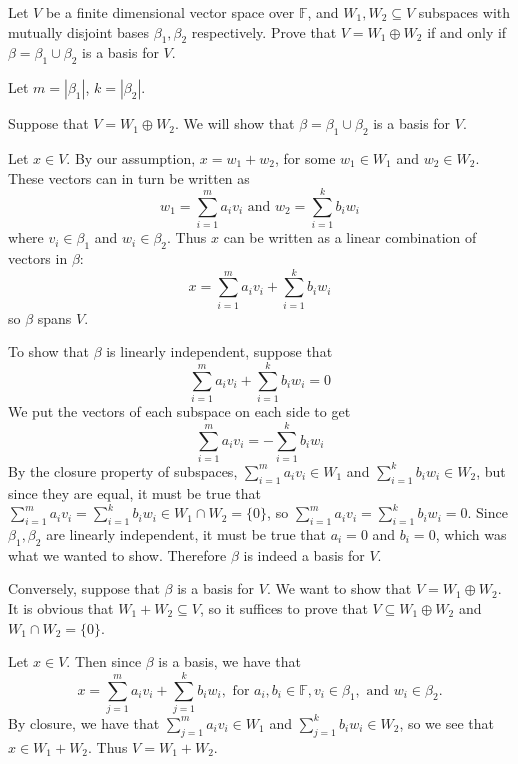 \documentclass{article}
\theoremstyle{plain} %
\numberwithin{thm}{section} %
\theoremstyle{definition}
\begin{document}
    \begin{question}{9}
        Let \( V \) be a finite dimensional vector space over \( \mathbb{F} \), and \( W_1, W_2 \subseteq V \) subspaces with mutually disjoint bases \( \beta_1, \beta_2 \) respectively. Prove that \( V = W_1 \oplus W_2 \) if and only if \( \beta = \beta_1 \cup \beta_2 \) is a basis for \( V \).

        \tcblower

        Let \(m = |\beta_1|\), \(k = |\beta _2|\).

        Suppose that \(V = W_1 \oplus W_2\). We will show that \(\beta = \beta _1 \cup \beta _2\) is a basis for \(V\).

        Let \(x \in V\). By our assumption, \(x = w_1 + w_2\), for some \(w_1 \in W_1\) and \(w_2 \in W_2\). These vectors can in turn be written as
        \[
            w_1 = \sum_{i=1}^m a_i v_i \text{ and } w_2 = \sum_{i=1} ^k b_i w_i
        \]
        where \(v_i \in \beta _1\) and \(w_i \in \beta _2\). Thus \(x\) can be written as a linear combination of vectors in \(\beta\):
        \[
            x = \sum_{i=1}^m a_i v_i + \sum_{i=1} ^k b_i w_i
        \]
        so \(\beta\) spans \(V\).

        To show that \(\beta\) is linearly independent, suppose that
        \[
            \sum_{i=1}^{m} a_i v_i + \sum_{i=1}^{k} b_i w_i = 0
        \]
        We put the vectors of each subspace on each side to get
        \[
            \sum_{i=1}^{m} a_i v_i = - \sum_{i=1}^{k} b_i w_i
        \]
        By the closure property of subspaces, \(\sum_{i=1}^{m} a_i v_i \in W_1\) and \(\sum_{i=1}^{k} b_i w_i \in W_2\), but since they are equal, it must be true that \(\sum_{i=1}^{m} a_i v_i = \sum_{i=1}^{k} b_i w_i \in W_1 \cap W_2 = \{ 0 \}\), so \(\sum_{i=1}^{m} a_i v_i = \sum_{i=1}^{k} b_i w_i = 0\). Since \(\beta _1, \beta _2\) are linearly independent, it must be true that \(a_i = 0\) and \(b_i = 0\), which was what we wanted to show. Therefore \(\beta\) is indeed a basis for \(V\).

        Conversely, suppose that \(\beta\) is a basis for \(V\). We want to show that \(V = W_1 \oplus W_2\). It is obvious that \(W_1 + W_2 \subseteq V\), so it suffices to prove that \(V \subseteq W_1 \oplus W_2\) and \(W_1 \cap W_2 = \{ 0 \}\).

        Let \(x \in V\). Then since \(\beta\) is a basis, we have that
        \[
            x = \sum_{j=1}^{m} a_i v_i + \sum_{j=1}^{k} b_i w_i, \text{ for } a_i, b_i \in \mathbb{F}, v_i \in \beta _1, \text{ and } w_i \in \beta _2.
        \]
        By closure, we have that \(\sum_{j=1}^{m} a_i v_i \in W_1\) and \(\sum_{j=1}^{k} b_i w_i \in W_2\), so we see that \(x \in W_1 + W_2\). Thus \(V = W_1 + W_2\).


\end{question}
\end{document}
